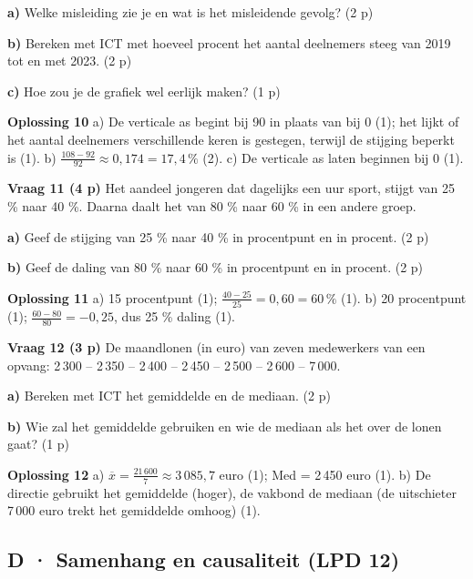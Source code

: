 \textbf{a)} Welke misleiding zie je en wat is het misleidende gevolg? (2 p) \lijn

\textbf{b)} Bereken met ICT met hoeveel procent het aantal deelnemers steeg van 2019 tot en met 2023. (2 p) \lijn

\textbf{c)} Hoe zou je de grafiek wel eerlijk maken? (1 p) \lijn

\begin{oplossing}
\textbf{Oplossing 10} \quad a) De verticale as begint bij 90 in plaats van bij 0 (1); het lijkt of het aantal deelnemers verschillende keren is gestegen, terwijl de stijging beperkt is (1). b) $\frac{108-92}{92}\approx 0{,}174=17{,}4\,\%$ (2). c) De verticale as laten beginnen bij 0 (1).
\end{oplossing}

\textbf{Vraag 11 \quad (4 p)} Het aandeel jongeren dat dagelijks een uur sport, stijgt van 25 \% naar 40 \%. Daarna daalt het van 80 \% naar 60 \% in een andere groep.

\textbf{a)} Geef de stijging van 25 \% naar 40 \% in procentpunt en in procent. (2 p) \lijn

\textbf{b)} Geef de daling van 80 \% naar 60 \% in procentpunt en in procent. (2 p) \lijn

\begin{oplossing}
\textbf{Oplossing 11} \quad a) 15 procentpunt (1); $\frac{40-25}{25}=0{,}60=60\,\%$ (1). b) 20 procentpunt (1); $\frac{60-80}{80}=-0{,}25$, dus 25 \% daling (1).
\end{oplossing}

\textbf{Vraag 12 \quad (3 p)} De maandlonen (in euro) van zeven medewerkers van een opvang: 2\,300 – 2\,350 – 2\,400 – 2\,450 – 2\,500 – 2\,600 – 7\,000.

\textbf{a)} Bereken met ICT het gemiddelde en de mediaan. (2 p) \lijn

\textbf{b)} Wie zal het gemiddelde gebruiken en wie de mediaan als het over de lonen gaat? (1 p) \lijn

\begin{oplossing}
\textbf{Oplossing 12} \quad a) $\overline{x}=\frac{21\,600}{7}\approx 3\,085{,}7$ euro (1); Med = 2\,450 euro (1). b) De directie gebruikt het gemiddelde (hoger), de vakbond de mediaan (de uitschieter 7\,000 euro trekt het gemiddelde omhoog) (1).
\end{oplossing}

\subsection*{D · Samenhang en causaliteit (LPD 12)}

